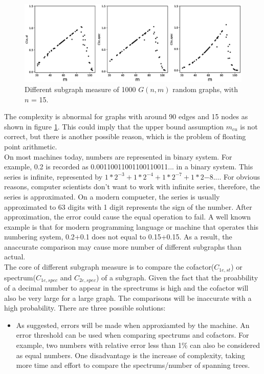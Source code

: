 \documentclass[12pt]{article}
\begin{document}
{\begin{figure}[ht]
    \includegraphics[width=\textwidth]{subgraph_measures.eps}
    \caption{Different subgraph measure of 1000 $G(n,m)$ random graphs, with $n$ = 15.}
    \label{fig:subgraph_measure}
\end{figure}
\noindent
The complexity is abnormal for graphs with around 90 edges and 15 nodes as shown in figure \ref{fig:subgraph_measure}. This could imply that the upper bound assumption $m_{cu}$ is not correct, but there is another possible reason, which is the problem of floating point arithmetic.\\
On most machines today, numbers are represented in binary system\cite{floating_point}. For example, 0.2 is recorded as 0.00110011001100110011... in a binary system. This series is infinite, represented by $1*2^{-3}+1*2^{-4}+1*2^{-7}+1*2{-8}...$. For obvious reasons, computer scientists don't want to work with infinite series, therefore, the series is approximated. On a modern compueter, the series is usually approximated to 63 digits with 1 digit represents the sign of the number. After approximation, the error could cause the equal operation to fail. A well known example is that for modern programming language or machine that operates this numbering system, 0.2+0.1 does not equal to 0.15+0.15. As a result, the anaccurate comparison may cause more number of different subgraphs than actual.\\
The core of different subgraph measure is to compare the cofactor($C_{1e,st}$) or spectrum($C_{1e,spec}$ and $C_{2e,spec}$) of a subgraph. Given the fact that the proabbility of a decimal number to appear in the sprectrums is high and the cofactor will also be very large for a large graph. The comparisons will be inaccurate with a high probability. There are three possible solutions:
\begin{itemize}
    \item As suggested, errors will be made when approxiamted by the machine. An error threshold can be used when comparing spectrums and cofactors. For example, two numbers with relative error less than 1\% can also be considered as equal numbers. One disadvantage is the increase of complexity, taking more time and effort to compare the spectrums/number of spanning trees.

\end{itemize}}
\end{document}
